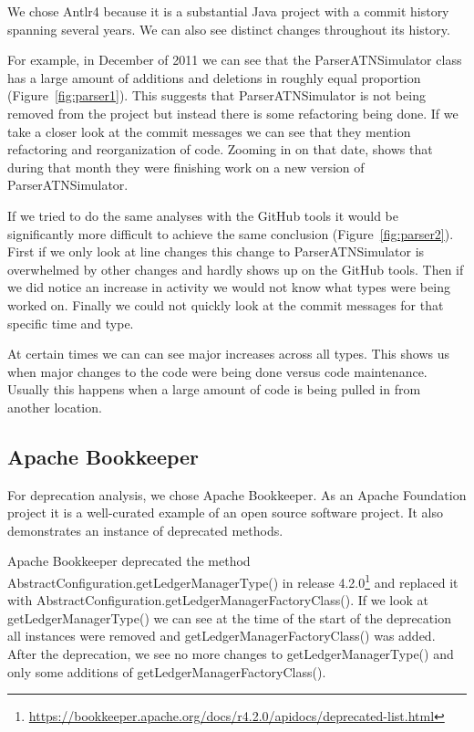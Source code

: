 \documentclass[conference]{IEEEtran}
\begin{document}
We chose Antlr4 because it is a substantial Java project with a commit history spanning several years. We can also see distinct changes throughout its history.

For example, in December of 2011 we can see that the ParserATNSimulator class has a large amount of additions and deletions in roughly equal proportion (Figure~\ref{fig:parser1}). This suggests that ParserATNSimulator is not being removed from the project but instead there is some refactoring being done. If we take a closer look at the commit messages we can see that they mention refactoring and reorganization of code. Zooming in on that date,  shows that during that month they were finishing work on a new version of ParserATNSimulator.

If we tried to do the same analyses with the GitHub tools it would be significantly more difficult to achieve the same conclusion (Figure~\ref{fig:parser2}). First if we only look at line changes this change to ParserATNSimulator is overwhelmed by other changes and hardly shows up on the GitHub tools. Then if we did notice an increase in activity we would not know what types were being worked on. Finally we could not quickly look at the commit messages for that specific time and type.

At certain times we can can see major increases across all types. This shows us when major changes to the code were being done versus code maintenance. Usually this happens when a large amount of code is being pulled in from another location.

\subsection{Apache Bookkeeper}

For deprecation analysis, we chose Apache Bookkeeper. As an Apache Foundation project it is a well-curated example of an open source software project. It also demonstrates an instance of deprecated methods. 

Apache Bookkeeper deprecated the method AbstractConfiguration.getLedgerManagerType() in release 4.2.0\footnote{\url{https://bookkeeper.apache.org/docs/r4.2.0/apidocs/deprecated-list.html}} and replaced it with AbstractConfiguration.getLedgerManagerFactoryClass(). If we look at getLedgerManagerType() we can see at the time of the start of the deprecation all instances were removed and getLedgerManagerFactoryClass() was added. After the deprecation, we see no more changes to getLedgerManagerType() and only some additions of getLedgerManagerFactoryClass().
\end{document}
